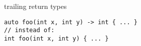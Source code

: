 \begin{frame}[fragile,label=trailingRet]{trailing return types}
\lstset{language=C++,style=smaller}
\begin{lstlisting}
auto foo(int x, int y) -> int { ... }
// instead of:
int foo(int x, int y) { ... }
\end{lstlisting}
\end{frame}
